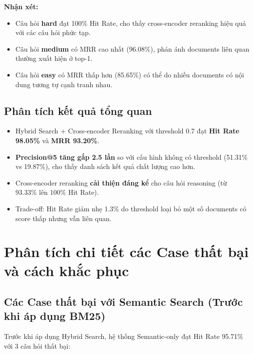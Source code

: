 \documentclass[../DoAn.tex]{subfiles}
\begin{document}
\textbf{Nhận xét:}
\begin{itemize}
    \item Câu hỏi \textbf{hard} đạt 100\% Hit Rate, cho thấy cross-encoder reranking hiệu quả với các câu hỏi phức tạp.
    \item Câu hỏi \textbf{medium} có MRR cao nhất (96.08\%), phản ánh documents liên quan thường xuất hiện ở top-1.
    \item Câu hỏi \textbf{easy} có MRR thấp hơn (85.65\%) có thể do nhiều documents có nội dung tương tự cạnh tranh nhau.
\end{itemize}

\subsection{Phân tích kết quả tổng quan}
\begin{itemize}
    \item Hybrid Search + Cross-encoder Reranking với threshold 0.7 đạt \textbf{Hit Rate 98.05\%} và \textbf{MRR 93.20\%}.
    \item \textbf{Precision@5 tăng gấp 2.5 lần} so với cấu hình không có threshold (51.31\% vs 19.87\%), cho thấy danh sách kết quả chất lượng cao hơn.
    \item Cross-encoder reranking \textbf{cải thiện đáng kể} cho câu hỏi reasoning (từ 93.33\% lên 100\% Hit Rate).
    \item Trade-off: Hit Rate giảm nhẹ 1.3\% do threshold loại bỏ một số documents có score thấp nhưng vẫn liên quan.
\end{itemize}

\section{Phân tích chi tiết các Case thất bại và cách khắc phục}

\subsection{Các Case thất bại với Semantic Search (Trước khi áp dụng BM25)}

Trước khi áp dụng Hybrid Search, hệ thống Semantic-only đạt Hit Rate 95.71\% với 3 câu hỏi thất bại:
\end{document}
